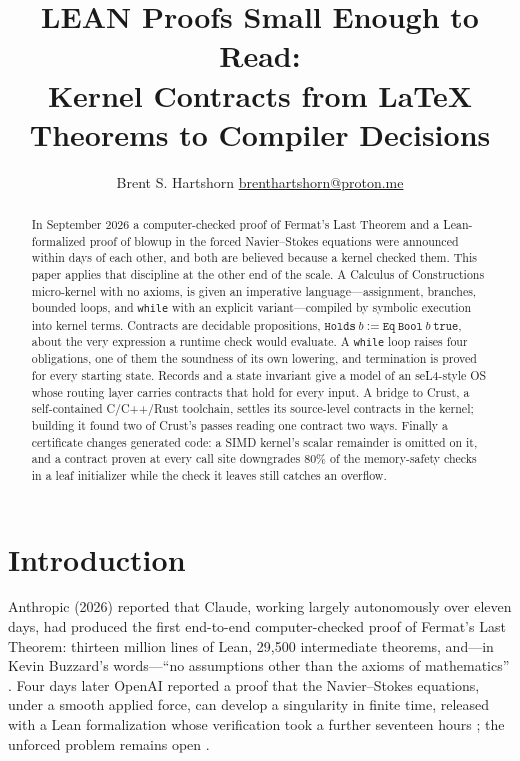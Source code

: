 \documentclass[11pt]{article}
\title{LEAN Proofs Small Enough to Read:\\
Kernel Contracts from \LaTeX{} Theorems to Compiler Decisions}
\author{Brent S. Hartshorn \orcidlink{0009-0004-2853-655X} \small \url{brenthartshorn@proton.me}}
\newcommand{\code}[1]{\texttt{#1}}
\begin{document}
\maketitle

\begin{abstract}
In September 2026 a computer-checked proof of Fermat's Last Theorem and a
Lean-formalized proof of blowup in the forced Navier--Stokes equations were
announced within days of each other, and both are believed because a kernel
checked them. This paper applies that discipline at the other end of the
scale. A Calculus of Constructions micro-kernel with no axioms, 
is given an imperative language---assignment, branches, bounded
loops, and \code{while} with an explicit variant---compiled by symbolic
execution into kernel terms. Contracts are decidable propositions,
$\code{Holds}\ b := \code{Eq}\ \code{Bool}\ b\ \code{true}$, about the very
expression a runtime check would evaluate. A \code{while} loop raises four
obligations, one of them the soundness of its own lowering, and termination
is proved for every starting state. Records and a state invariant give a model
of an seL4-style OS whose routing layer carries contracts that hold for every
input. A bridge to Crust, a self-contained C/C++/Rust toolchain, settles its
source-level contracts in the kernel; building it found two of Crust's passes
reading one contract two ways. Finally a certificate changes generated code: a
SIMD kernel's scalar remainder is omitted on it, 
and a contract proven at every call site downgrades 80\% of the
memory-safety checks in a leaf initializer while the check it leaves still
catches an overflow.
\end{abstract}

\section{Introduction}

Anthropic (2026) reported that Claude, working largely
autonomously over eleven days, had produced the first end-to-end
computer-checked proof of Fermat's Last Theorem: thirteen million lines of
Lean, 29{,}500 intermediate theorems, and---in Kevin Buzzard's words---``no
assumptions other than the axioms of mathematics''
\cite{anthropic2026flt,newscientist2026flt,nature2026flt}. Four days later
OpenAI reported a proof that the Navier--Stokes equations, under a smooth
applied force, can develop a singularity in finite time, released with a Lean
formalization whose verification took a further seventeen hours
\cite{openai2026ns}; the unforced problem remains open \cite{mcgreivy2026}.
\end{document}
